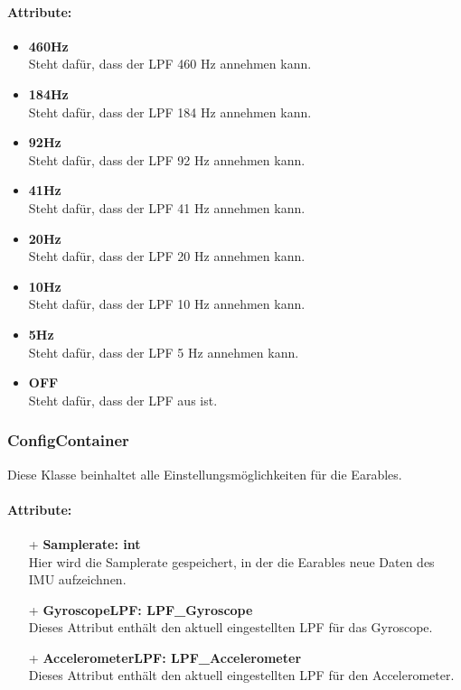 \documentclass[a4paper,12pt]{article}
\begin{document}
\paragraph{Attribute:}
\begin{itemize}
	\item \textbf{460Hz}\\Steht dafür, dass der LPF 460 Hz annehmen kann.
	\item \textbf{184Hz}\\Steht dafür, dass der LPF 184 Hz annehmen kann.
	\item \textbf{92Hz}\\Steht dafür, dass der LPF 92 Hz annehmen kann.
	\item \textbf{41Hz}\\Steht dafür, dass der LPF 41 Hz annehmen kann.
	\item \textbf{20Hz}\\Steht dafür, dass der LPF 20 Hz annehmen kann.
	\item \textbf{10Hz}\\Steht dafür, dass der LPF 10 Hz annehmen kann.
	\item \textbf{5Hz}\\Steht dafür, dass der LPF 5 Hz annehmen kann.
	\item \textbf{OFF}\\Steht dafür, dass der LPF aus ist.
\end{itemize}


\subsubsection{ConfigContainer}
Diese Klasse beinhaltet alle Einstellungsmöglichkeiten für die Earables.

\paragraph{Attribute:}
\begin{itemize}
	\item[+] \textbf{Samplerate: int}\\Hier wird die Samplerate gespeichert, in der die Earables neue Daten des IMU aufzeichnen.
	\item[+] \textbf{GyroscopeLPF: LPF\_Gyroscope}\\Dieses Attribut enthält den aktuell eingestellten LPF für das Gyroscope.
	\item[+] \textbf{AccelerometerLPF: LPF\_Accelerometer}\\Dieses Attribut enthält den aktuell eingestellten LPF für den Accelerometer.
\end{itemize}
\end{document}
